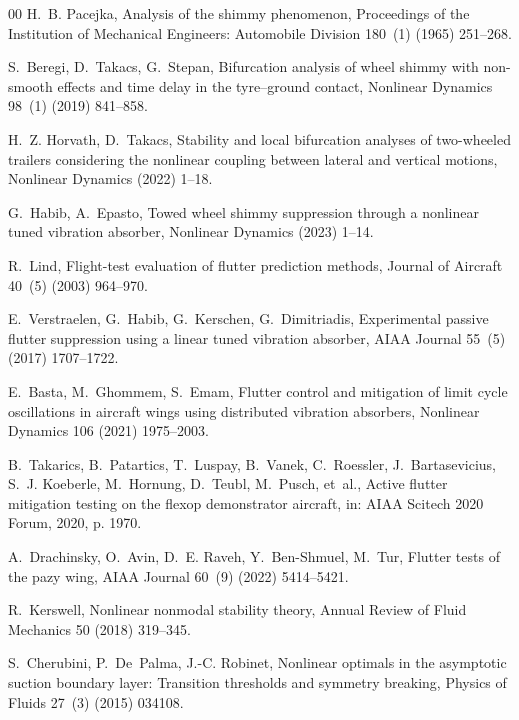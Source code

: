 \documentclass[preprint,12pt]{elsarticle}
\begin{document}
	\begin{thebibliography}{00}
		H.~B. Pacejka, Analysis of the shimmy phenomenon, Proceedings of the
		Institution of Mechanical Engineers: Automobile Division 180~(1) (1965)
		251--268.
		
		S.~Beregi, D.~Takacs, G.~Stepan, Bifurcation analysis of wheel shimmy with
		non-smooth effects and time delay in the tyre--ground contact, Nonlinear
		Dynamics 98~(1) (2019) 841--858.
		
		H.~Z. Horvath, D.~Takacs, Stability and local bifurcation analyses of
		two-wheeled trailers considering the nonlinear coupling between lateral and
		vertical motions, Nonlinear Dynamics (2022) 1--18.
		
		G.~Habib, A.~Epasto, Towed wheel shimmy suppression through a nonlinear tuned
		vibration absorber, Nonlinear Dynamics (2023) 1--14.
		
		R.~Lind, Flight-test evaluation of flutter prediction methods, Journal of
		Aircraft 40~(5) (2003) 964--970.
		
		E.~Verstraelen, G.~Habib, G.~Kerschen, G.~Dimitriadis, Experimental passive
		flutter suppression using a linear tuned vibration absorber, AIAA Journal
		55~(5) (2017) 1707--1722.
		
		E.~Basta, M.~Ghommem, S.~Emam, Flutter control and mitigation of limit cycle
		oscillations in aircraft wings using distributed vibration absorbers,
		Nonlinear Dynamics 106 (2021) 1975--2003.
		
		B.~Takarics, B.~Patartics, T.~Luspay, B.~Vanek, C.~Roessler, J.~Bartasevicius,
		S.~J. Koeberle, M.~Hornung, D.~Teubl, M.~Pusch, et~al., Active flutter
		mitigation testing on the flexop demonstrator aircraft, in: AIAA Scitech 2020
		Forum, 2020, p. 1970.
		
		A.~Drachinsky, O.~Avin, D.~E. Raveh, Y.~Ben-Shmuel, M.~Tur, Flutter tests of
		the pazy wing, AIAA Journal 60~(9) (2022) 5414--5421.
		
		R.~Kerswell, Nonlinear nonmodal stability theory, Annual Review of Fluid
		Mechanics 50 (2018) 319--345.
		
		S.~Cherubini, P.~De~Palma, J.-C. Robinet, Nonlinear optimals in the asymptotic
		suction boundary layer: Transition thresholds and symmetry breaking, Physics
		of Fluids 27~(3) (2015) 034108.
		

\end{thebibliography}
\end{document}
